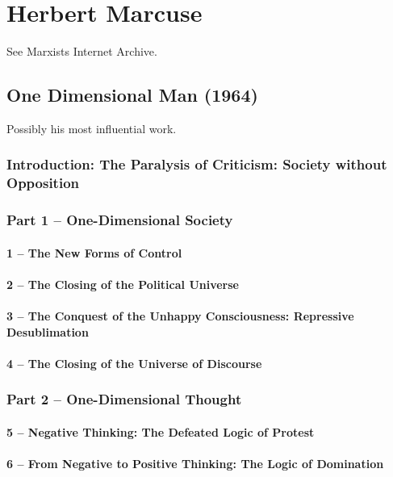 \documentclass[10pt,titlepage]{book}
\begin{document}
\cite{macdonald-bbi, macdonald-woc, macdonald-tdd}

\section{Herbert Marcuse}

See Marxists Internet Archive\cite{marcuse-mia}.

\subsection{One Dimensional Man (1964) \cite{marcuse-one-dim}}

Possibly his most influential work.

\subsubsection{Introduction: The Paralysis of Criticism: Society without Opposition}
\subsubsection{Part 1 – One-Dimensional Society}
\paragraph{1 – The New Forms of Control}
\paragraph{2 – The Closing of the Political Universe}
\paragraph{3 – The Conquest of the Unhappy Consciousness: Repressive Desublimation}
\paragraph{4 – The Closing of the Universe of Discourse}
\subsubsection{Part 2 – One-Dimensional Thought}
\paragraph{5 – Negative Thinking: The Defeated Logic of Protest}
\paragraph{6 – From Negative to Positive Thinking: The Logic of Domination}
\end{document}
